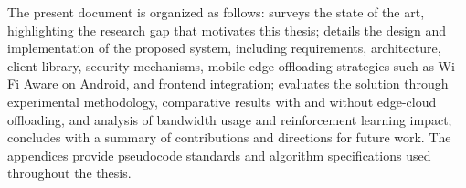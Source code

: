 \quad The present document is organized as follows: \textbf{} surveys the state of the art, highlighting the research gap that motivates this thesis; \textbf{} details the design and implementation of the proposed system, including requirements, architecture, client library, security mechanisms, mobile edge offloading strategies such as Wi-Fi Aware on Android, and frontend integration; \textbf{} evaluates the solution through experimental methodology, comparative results with and without edge-cloud offloading, and analysis of bandwidth usage and reinforcement learning impact; \textbf{} concludes with a summary of contributions and directions for future work. The appendices provide pseudocode standards and algorithm specifications used throughout the thesis.
